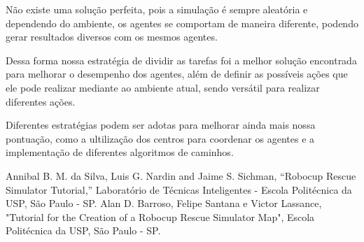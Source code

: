 \documentclass[conference]{IEEEtran}
\begin{document}
Não existe uma solução perfeita, pois a simulação é sempre aleatória e dependendo do ambiente, os agentes se comportam de maneira diferente, podendo gerar resultados diversos com os mesmos agentes.

Dessa forma nossa estratégia de dividir as tarefas foi a melhor solução encontrada para melhorar o desempenho dos agentes, além de definir as possíveis ações que ele pode realizar mediante ao ambiente atual, sendo versátil para realizar diferentes ações.

Diferentes estratégias podem ser adotas para melhorar ainda mais nossa pontuação, como a ultilização dos centros para coordenar os agentes e a implementação de diferentes algoritmos de caminhos.

\begin{thebibliography}{00}
 Annibal B. M. da Silva, Luis G. Nardin and Jaime S. Sichman, ``Robocup Rescue Simulator Tutorial,'' Laboratório de Técnicas Inteligentes - Escola Politécnica da USP, São Paulo - SP.
 Alan D. Barroso, Felipe Santana e Victor Lassance, "Tutorial for the Creation of a Robocup Rescue Simulator Map", Escola Politécnica da USP, São Paulo - SP.

\end{thebibliography}
\end{document}
